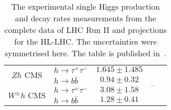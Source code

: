 \begin{table}[htb!]
{{\begin{tabular}{clccc}
\midrule
\midrule
\multirow{2}{*}{ \normalsize $Zh$ { \scriptsize {\color{Mahogany} CMS     }   }}    & $h\to \tau^+\tau^- $ & $1.645 \pm 1.485$&\multirow{5}{*}{--} &\multirow{5}{*}{ \cite{CMS:2020gsy} }  \\
& $h\to  b \bar b$       &$0.94 \pm 0.32$&&\\                         
 \cmidrule(r){2-3}    
\multirow{2}{*}{ \normalsize $W^\pm h${ \scriptsize {\color{Mahogany} CMS     }   }}           & $h\to \tau^+\tau^- $ &$3.08 \pm 1.58$&&\\
& $h\to  b \bar b$      & $1.28 \pm 0.41$&&\\                  
\midrule
\midrule
\end{tabular}
}
}
\caption{The experimental single Higgs production and decay rates measurements from the  complete  data of LHC Run II and projections for the HL-LHC. The uncertainties were symmetrised here. The table is published in~\cite{Alasfar:2022zyr}.  }
\label{table:resHiggsExp}
\end{table}